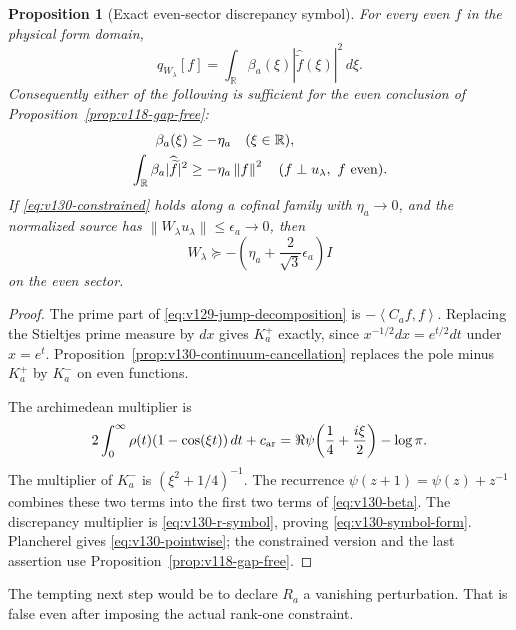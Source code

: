 \documentclass[11pt]{article}
\newtheorem{proposition}[theorem]{Proposition}
\theoremstyle{remark}
\newcommand{\norm}[1]{\left\lVert #1\right\rVert}
\newcommand{\ip}[2]{\left\langle #1,#2\right\rangle}
\begin{document}
\begin{proposition}[Exact even-sector discrepancy symbol]
\label{prop:v130-remainder}
For every even $f$ in the physical form domain,
\begin{equation}\label{eq:v130-symbol-form}
 q_{W_\lambda}[f]
   =\int_{\mathbb R}\beta_a(\xi)
          |\widehat{\widetilde f}(\xi)|^2\,d\xi .
\end{equation}
Consequently either of the following is sufficient for the even
conclusion of Proposition~\ref{prop:v118-gap-free}:
\begin{align}
 \beta_a(\xi)&\ge-\eta_a\quad(\xi\in\mathbb R),\label{eq:v130-pointwise}\\
 \int_{\mathbb R}\beta_a|\widehat{\widetilde f}|^2
   &\ge-\eta_a\norm f^2
   \quad(f\perp u_\lambda,\ f\ {\rm even}).\label{eq:v130-constrained}
\end{align}
If \eqref{eq:v130-constrained} holds along a cofinal family with
$\eta_a\to0$, and the normalized source has
$\norm{W_\lambda u_\lambda}\le\epsilon_a\to0$, then
\[
 W_\lambda\succeq-
 \left(\eta_a+\frac{2}{\sqrt3}\epsilon_a\right)I
\]
on the even sector.
\end{proposition}
\begin{proof}
The prime part of \eqref{eq:v129-jump-decomposition} is
$-\ip{C_af}f$. Replacing the Stieltjes prime measure by $dx$ gives
$K_a^+$ exactly, since $x^{-1/2}dx=e^{t/2}dt$ under $x=e^t$.
Proposition~\ref{prop:v130-continuum-cancellation} replaces the pole
minus $K_a^+$ by $K_a^-$ on even functions.

The archimedean multiplier is
\[
 2\int_0^\infty\rho(t)(1-\cos(\xi t))\,dt+c_{\rm ar}
 =\Re\psi\!\left(\frac14+\frac{i\xi}{2}\right)-\log\pi.
\]
The multiplier of $K_a^-$ is $(\xi^2+1/4)^{-1}$. The recurrence
$\psi(z+1)=\psi(z)+z^{-1}$ combines these two terms into the first
two terms of \eqref{eq:v130-beta}. The discrepancy multiplier is
\eqref{eq:v130-r-symbol}, proving \eqref{eq:v130-symbol-form}.
Plancherel gives \eqref{eq:v130-pointwise}; the constrained version
and the last assertion use Proposition~\ref{prop:v118-gap-free}.
\end{proof}

The tempting next step would be to declare $R_a$ a vanishing
perturbation. That is false even after imposing the actual rank-one
constraint.
\end{document}
